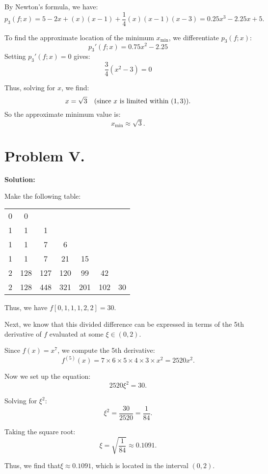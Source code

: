 \documentclass[a4paper, 12pt]{article}
\begin{document}
By Newton's formula, we have:
\[
p_3(f; x) = 5 - 2x + (x)(x-1) + \frac{1}{4}(x)(x-1)(x-3) = \boxed{0.25x^3 - 2.25x + 5}.
\]

To find the approximate location of the minimum \( x_{\min} \), we differentiate \( p_3(f; x) \):
\[
p_3'(f; x) = 0.75x^2 - 2.25
\]
Setting \( p_3'(f; x) = 0 \) gives:
\[
\frac{3}{4} (x^2 - 3) = 0
\]

Thus, solving for \( x \), we find:
\[
x = \sqrt{3} \quad \text{(since \( x \) is limited within \( (1, 3) \))}.
\]
So the approximate minimum value is:
\[
\boxed{x_{\min} \approx \sqrt{3}}.
\]

\section*{Problem V.}

\textbf{Solution:}

Make the following table:

\begin{table}[htbp]
    \centering
    \begin{tabular}{c|cccccc}
        0 & 0 &  &  &  &  &  \\ 
        1 & 1 & 1 &  &  &  &  \\ 
        1 & 1 & 7 & 6 &  &  &  \\ 
        1 & 1 & 7 & 21 & 15 &  &  \\ 
        2 & 128 & 127 & 120 & 99 & 42 & \\ 
        2 & 128 & 448 & 321 & 201 & 102 & 30 \\ 
    \end{tabular}
\end{table}

Thus, we have \( \boxed{f[0, 1, 1, 1, 2, 2] = 30} \).

Next, we know that this divided difference can be expressed in terms of the 5th derivative of \( f \) evaluated at some \( \xi \in (0, 2) \). 

Since \( f(x) = x^7 \), we compute the 5th derivative:
\[
f^{(5)}(x) = 7 \times 6 \times 5 \times 4 \times 3 \times x^2 = 2520x^2.
\]

Now we set up the equation:
\[
2520\xi^2 = 30.
\]

Solving for \( \xi^2 \):
\[
\xi^2 = \frac{30}{2520} = \frac{1}{84}.
\]

Taking the square root:
\[
\xi = \sqrt{\frac{1}{84}} \approx 0.1091.
\]

Thus, we find that\(\boxed{\xi \approx 0.1091}\), which is located in the interval \( (0, 2) \).
\end{document}
